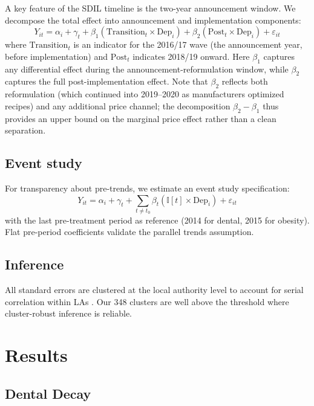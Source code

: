 \documentclass[12pt]{article}
\newcommand{\ind}{\mathbb{I}}
\begin{document}
A key feature of the SDIL timeline is the two-year announcement window. We decompose the total effect into announcement and implementation components:
\begin{equation}
Y_{it} = \alpha_i + \gamma_t + \beta_1 (\text{Transition}_t \times \text{Dep}_i) + \beta_2 (\text{Post}_t \times \text{Dep}_i) + \varepsilon_{it}
\label{eq:decomp}
\end{equation}
where $\text{Transition}_t$ is an indicator for the 2016/17 wave (the announcement year, before implementation) and $\text{Post}_t$ indicates 2018/19 onward. Here $\beta_1$ captures any differential effect during the announcement-reformulation window, while $\beta_2$ captures the full post-implementation effect. Note that $\beta_2$ reflects both reformulation (which continued into 2019--2020 as manufacturers optimized recipes) and any additional price channel; the decomposition $\beta_2 - \beta_1$ thus provides an upper bound on the marginal price effect rather than a clean separation.

\subsection{Event study}

For transparency about pre-trends, we estimate an event study specification:
\begin{equation}
Y_{it} = \alpha_i + \gamma_t + \sum_{t \neq t_0} \beta_t (\ind[t] \times \text{Dep}_i) + \varepsilon_{it}
\label{eq:eventstudy}
\end{equation}
with the last pre-treatment period as reference (2014 for dental, 2015 for obesity). Flat pre-period coefficients validate the parallel trends assumption.

\subsection{Inference}

All standard errors are clustered at the local authority level to account for serial correlation within LAs \citep{callaway2021}. Our 348 clusters are well above the threshold where cluster-robust inference is reliable.

\section{Results}
\label{sec:results}

\subsection{Dental Decay}
\end{document}
